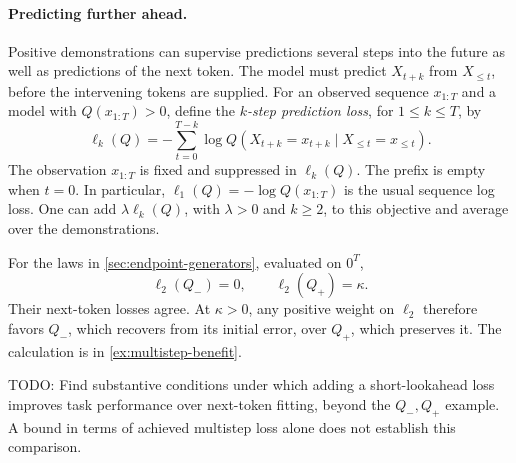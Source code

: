 \documentclass[11pt,twoside]{article}
\theoremstyle{definition}
\theoremstyle{remark}
\begin{document}
\paragraph{Predicting further ahead.}
\label{sec:multistep}

Positive demonstrations can supervise predictions several steps into the
future as well as predictions of the next token. The model must predict
\(X_{t+k}\) from \(X_{\le t}\), before the intervening tokens are supplied.
For an observed sequence \(x_{1:T}\) and a model with \(Q(x_{1:T})>0\),
define the \emph{\(k\)-step prediction loss}, for \(1\le k\le T\), by
\begin{equation}
  \ell_k(Q)
  =-\sum_{t=0}^{T-k}
  \log Q(X_{t+k}=x_{t+k}\mid X_{\le t}=x_{\le t}).
  \label{eq:multistep-loss}
\end{equation}
The observation \(x_{1:T}\) is fixed and suppressed in \(\ell_k(Q)\).
The prefix is empty when \(t=0\). In particular,
\(\ell_1(Q)=-\log Q(x_{1:T})\) is the usual sequence log loss.
One can add \(\lambda\ell_k(Q)\), with \(\lambda>0\) and \(k\ge2\),
to this objective and average over the demonstrations.

For the laws in \cref{sec:endpoint-generators}, evaluated on \(0^T\),
\begin{equation}
 \ell_2(Q_-)=0,\qquad \ell_2(Q_+)=\kappa.
 \label{eq:endpoint-multistep}
\end{equation}
Their next-token losses agree. At \(\kappa>0\), any positive weight
on \(\ell_2\) therefore favors \(Q_-\), which recovers from its initial
error, over \(Q_+\), which preserves it. The calculation is in
\cref{ex:multistep-benefit}.\label{en:multistep-misspecification}

TODO: Find substantive conditions under which adding a short-lookahead
loss improves task performance over next-token fitting, beyond the
\(Q_-,Q_+\) example. A bound in terms of achieved multistep loss alone
does not establish this comparison.
\end{document}
